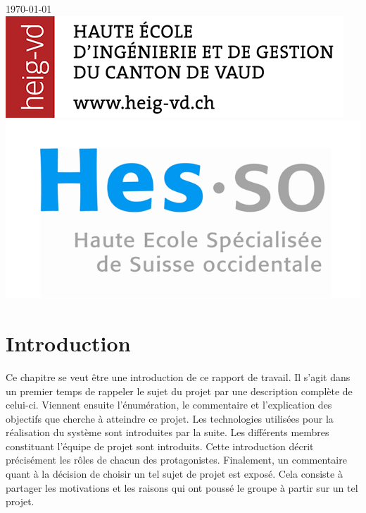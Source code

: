 \documentclass[11pt,a4paper,oldfontcommands]{memoir}
\begin{document}
\begin{titlepage}

{\large \today}\\[3cm]


\includegraphics[scale=0.3]{images/heigvd.png}
\hfill
\includegraphics[scale=0.6]{images/hesso.png}

\vfill
\end{titlepage}

\cleardoublepage
\tableofcontents*
\cleardoublepage
\listoffigures*
\cleardoublepage
\listoftables*
\cleardoublepage


\chapter{Introduction}

Ce chapitre se veut être une introduction de ce rapport de travail. Il s'agit dans un premier temps de rappeler le sujet du projet par une description complète de celui-ci. Viennent ensuite l'énumération, le commentaire et l'explication des objectifs que cherche à atteindre ce projet. Les technologies utilisées pour la réalisation du système sont introduites par la suite. Les différents membres constituant l'équipe de projet sont introduits. Cette introduction décrit précisément les rôles de chacun des protagonistes. Finalement, un commentaire quant à la décision de choisir un tel sujet de projet est exposé. Cela consiste à partager les motivations et les raisons qui ont poussé le groupe à partir sur un tel projet.
\end{document}
